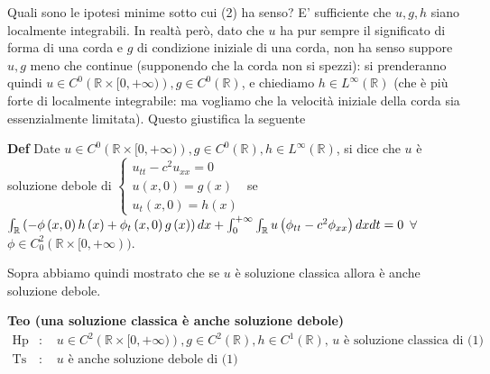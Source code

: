 \documentclass{article}
\begin{document}
Quali sono le ipotesi minime sotto cui (2) ha senso? E' sufficiente che $%
u,g,h$ siano localmente integrabili. In realt\`{a} per\`{o}, dato che $u$ ha
pur sempre il significato di forma di una corda e $g$ di condizione iniziale
di una corda, non ha senso suppore $u,g$ meno che continue (supponendo che
la corda non si spezzi): si prenderanno quindi $u\in C^{0}\left( 
\mathbb{R}
\times \lbrack 0,+\infty )\right) ,g\in C^{0}\left( 
\mathbb{R}
\right) $, e chiediamo $h\in L^{\infty }\left( 
\mathbb{R}
\right) $ (che \`{e} pi\`{u} forte di localmente integrabile: ma vogliamo
che la velocit\`{a} iniziale della corda sia essenzialmente limitata).
Questo giustifica la seguente

\textbf{Def} Date $u\in C^{0}\left( 
\mathbb{R}
\times \lbrack 0,+\infty )\right) ,g\in C^{0}\left( 
\mathbb{R}
\right) ,h\in L^{\infty }\left( 
\mathbb{R}
\right) $, si dice che $u$ \`{e} soluzione debole di $\left\{ 
\begin{array}{c}
u_{tt}-c^{2}u_{xx}=0 \\ 
u\left( x,0\right) =g\left( x\right) \\ 
u_{t}\left( x,0\right) =h\left( x\right)%
\end{array}%
\right. $ se $\int_{%
\mathbb{R}
}\left( -\phi \left( x,0\right) h\left( x\right) +\phi _{t}\left( x,0\right)
g\left( x\right) \right) dx+\int_{0}^{+\infty }\int_{%
\mathbb{R}
}u\left( \phi _{tt}-c^{2}\phi _{xx}\right) dxdt=0$ $\forall $ $\phi \in
C_{0}^{2}\left( 
\mathbb{R}
\times \lbrack 0,+\infty \right) )$.

Sopra abbiamo quindi mostrato che se $u$ \`{e} soluzione classica allora 
\`{e} anche soluzione debole.

\textbf{Teo (una soluzione classica \`{e} anche soluzione debole)}%
\begin{eqnarray*}
\text{Hp} &\text{: }&u\in C^{2}\left( 
\mathbb{R}
\times \lbrack 0,+\infty )\right) ,g\in C^{2}\left( 
\mathbb{R}
\right) ,h\in C^{1}\left( 
\mathbb{R}
\right) \text{, }u\text{ \`{e} soluzione classica di (1)} \\
\text{Ts} &\text{: }&u\text{ \`{e} anche soluzione debole di (1)}
\end{eqnarray*}
\end{document}

